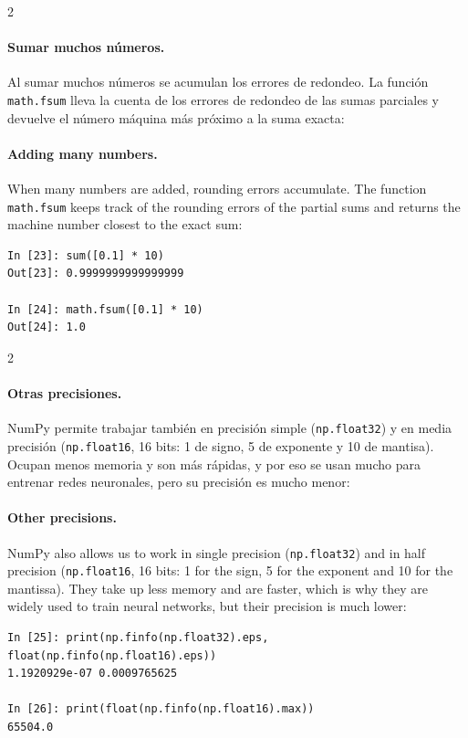 \begin{paracol}{2}
\paragraph{Sumar muchos números.} Al sumar muchos números se acumulan los errores de redondeo. La función \texttt{math.fsum} lleva la cuenta de los errores de redondeo de las sumas parciales y devuelve el número máquina más próximo a la suma exacta:
\switchcolumn
\paragraph{Adding many numbers.} When many numbers are added, rounding errors accumulate. The function \texttt{math.fsum} keeps track of the rounding errors of the partial sums and returns the machine number closest to the exact sum:
\end{paracol}
\begin{verbatim}
In [23]: sum([0.1] * 10)
Out[23]: 0.9999999999999999

In [24]: math.fsum([0.1] * 10)
Out[24]: 1.0
\end{verbatim}
\begin{paracol}{2}
\paragraph{Otras precisiones.} NumPy permite trabajar también en precisión simple (\texttt{np.float32}) y en media precisión (\texttt{np.float16}, 16 bits: 1 de signo, 5 de exponente y 10 de mantisa). Ocupan menos memoria y son más rápidas, y por eso se usan mucho para entrenar redes neuronales, pero su precisión es mucho menor:
\switchcolumn
\paragraph{Other precisions.} NumPy also allows us to work in single precision (\texttt{np.float32}) and in half precision (\texttt{np.float16}, 16 bits: 1 for the sign, 5 for the exponent and 10 for the mantissa). They take up less memory and are faster, which is why they are widely used to train neural networks, but their precision is much lower:
\end{paracol}
\begin{verbatim}
In [25]: print(np.finfo(np.float32).eps, float(np.finfo(np.float16).eps))
1.1920929e-07 0.0009765625

In [26]: print(float(np.finfo(np.float16).max))
65504.0
\end{verbatim}

